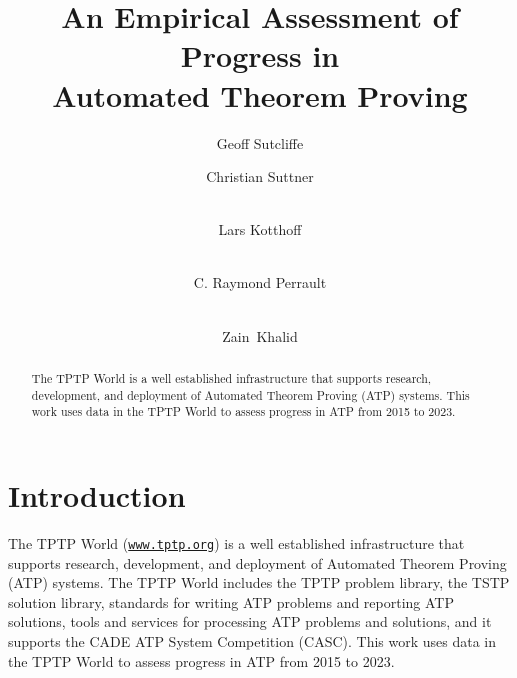 \documentclass[runningheads]{llncs}
\begin{document}
\title{An Empirical Assessment of Progress in \\ Automated Theorem Proving}

\author{
Geoff Sutcliffe
\and
Christian Suttner
\and \\
Lars Kotthoff
\and \\
C. Raymond Perrault
\and \\
Zain~Khalid
}

\maketitle
\begin{abstract}
The TPTP World is a well established infrastructure that supports research, development, and 
deployment of Automated Theorem Proving (ATP) systems.
This work uses data in the TPTP World to assess progress in ATP from 2015 to 2023.

\end{abstract}
\section{Introduction}
\label{Introduction}

The TPTP World \cite{Sut17} (\href{https://www.tptp.org}{\tt www.tptp.org}) is a well established 
infrastructure that supports research, development, and deployment of Automated Theorem Proving 
(ATP) systems.
The TPTP World includes the TPTP problem library,
the TSTP solution library,
standards for writing ATP problems and reporting ATP solutions,
tools and services for processing ATP problems and solutions,
and it supports the CADE ATP System Competition (CASC).
This work uses data in the TPTP World to assess progress in ATP from 2015 to 2023.
\end{document}
